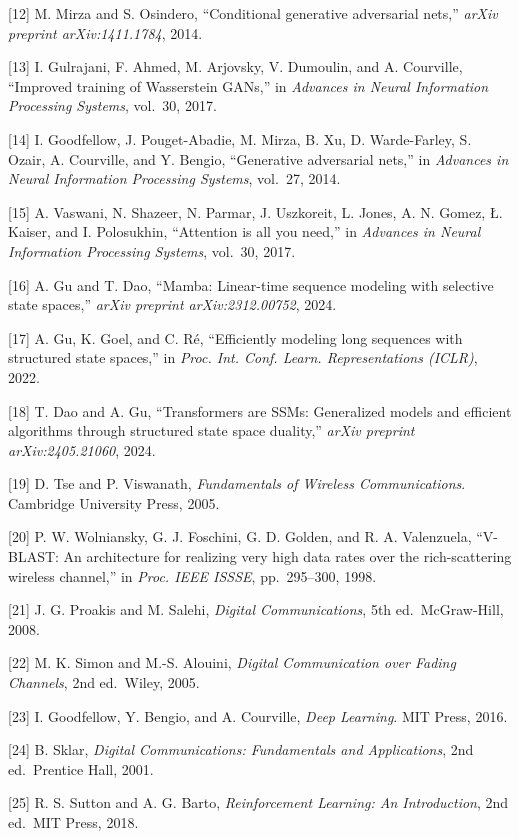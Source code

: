 {[}12{]} M. Mirza and S. Osindero, ``Conditional generative adversarial nets,'' \emph{arXiv preprint arXiv:1411.1784}, 2014.

{[}13{]} I. Gulrajani, F. Ahmed, M. Arjovsky, V. Dumoulin, and A. Courville, ``Improved training of Wasserstein GANs,'' in \emph{Advances in Neural Information Processing Systems}, vol.~30, 2017.

{[}14{]} I. Goodfellow, J. Pouget-Abadie, M. Mirza, B. Xu, D. Warde-Farley, S. Ozair, A. Courville, and Y. Bengio, ``Generative adversarial nets,'' in \emph{Advances in Neural Information Processing Systems}, vol.~27, 2014.

{[}15{]} A. Vaswani, N. Shazeer, N. Parmar, J. Uszkoreit, L. Jones, A. N. Gomez, Ł. Kaiser, and I. Polosukhin, ``Attention is all you need,'' in \emph{Advances in Neural Information Processing Systems}, vol.~30, 2017.

{[}16{]} A. Gu and T. Dao, ``Mamba: Linear-time sequence modeling with selective state spaces,'' \emph{arXiv preprint arXiv:2312.00752}, 2024.

{[}17{]} A. Gu, K. Goel, and C. Ré, ``Efficiently modeling long sequences with structured state spaces,'' in \emph{Proc. Int. Conf. Learn. Representations (ICLR)}, 2022.

{[}18{]} T. Dao and A. Gu, ``Transformers are SSMs: Generalized models and efficient algorithms through structured state space duality,'' \emph{arXiv preprint arXiv:2405.21060}, 2024.

{[}19{]} D. Tse and P. Viswanath, \emph{Fundamentals of Wireless Communications}. Cambridge University Press, 2005.

{[}20{]} P. W. Wolniansky, G. J. Foschini, G. D. Golden, and R. A. Valenzuela, ``V-BLAST: An architecture for realizing very high data rates over the rich-scattering wireless channel,'' in \emph{Proc. IEEE ISSSE}, pp.~295--300, 1998.

{[}21{]} J. G. Proakis and M. Salehi, \emph{Digital Communications}, 5th ed.~McGraw-Hill, 2008.

{[}22{]} M. K. Simon and M.-S. Alouini, \emph{Digital Communication over Fading Channels}, 2nd ed.~Wiley, 2005.

{[}23{]} I. Goodfellow, Y. Bengio, and A. Courville, \emph{Deep Learning}. MIT Press, 2016.

{[}24{]} B. Sklar, \emph{Digital Communications: Fundamentals and Applications}, 2nd ed.~Prentice Hall, 2001.

{[}25{]} R. S. Sutton and A. G. Barto, \emph{Reinforcement Learning: An Introduction}, 2nd ed.~MIT Press, 2018.

